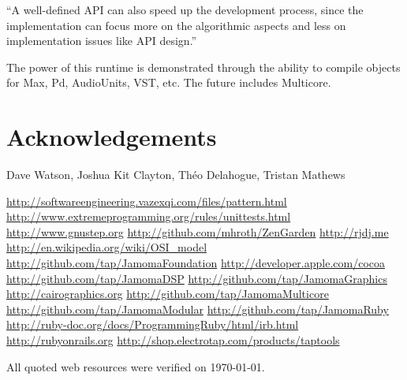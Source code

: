 \documentclass[twoside,10pt]{article}
\begin{document}
``A well-defined API can also speed up the development process, since the implementation can focus more on the algorithmic aspects and less on implementation issues like API design.'' \cite{Lerch:2005}

The power of this runtime is demonstrated through the ability to compile objects for Max, Pd, AudioUnits, VST, etc.  The future includes Multicore.



\section{Acknowledgements} %

Dave Watson, Joshua Kit Clayton, Th\'eo Delahogue, Tristan Mathews





\renewcommand{\refname}{Web Resources}
\begin{thebibliography}{99}
	\footnotesize
{}    \url{http://softwareengineering.vazexqi.com/files/pattern.html}
    \url{http://www.extremeprogramming.org/rules/unittests.html}
    \url{http://www.gnustep.org} 
    \url{http://github.com/mhroth/ZenGarden}  
    \url{http://rjdj.me} 
    \url{http://en.wikipedia.org/wiki/OSI_model}
    \url{http://github.com/tap/JamomaFoundation}     
    \url{http://developer.apple.com/cocoa}    
 	  \url{http://github.com/tap/JamomaDSP}
  \url{http://github.com/tap/JamomaGraphics} 
  \url{http://cairographics.org}
  \url{http://github.com/tap/JamomaMulticore}
  \url{http://github.com/tap/JamomaModular}
  \url{http://github.com/tap/JamomaRuby}
  \url{http://ruby-doc.org/docs/ProgrammingRuby/html/irb.html}
  \url{http://rubyonrails.org}   
 \url{http://shop.electrotap.com/products/taptools}
\end{thebibliography} 
All quoted web resources were verified on \today.
\end{document}
